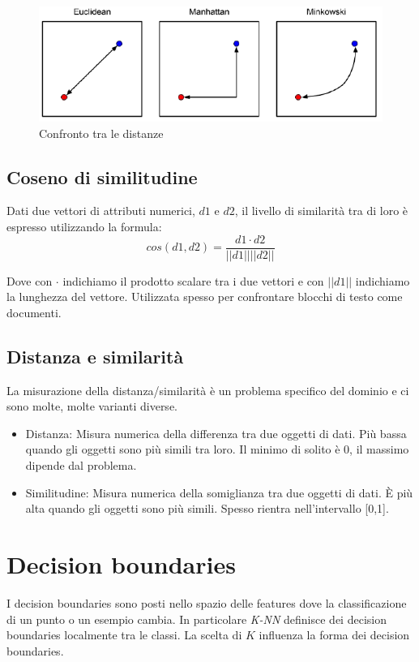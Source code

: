 \begin{figure}
	\centering
	\includegraphics[width=0.6\linewidth]{imgs/chapter3/img2}
	\caption{Confronto tra le distanze}
	\label{fig:chapter03-02}
\end{figure}

	\subsection{Coseno di similitudine}
	
	Dati due vettori di attributi numerici, $d1$ e $d2$, il livello di similarità tra di loro \`e espresso utilizzando la formula:
	$$cos(d1,d2)=\frac{d1 \cdot d2}{||d1|| ||d2||}$$
	
	Dove con $\cdot$ indichiamo il prodotto scalare tra i due vettori e con $||d1||$ indichiamo la lunghezza del vettore. 
	Utilizzata spesso per confrontare blocchi di testo come documenti.

	\subsection{Distanza e similarit\`a}
	La misurazione della distanza/similarità \`e un problema specifico del dominio e ci sono molte, molte varianti diverse.
	\begin{itemize}
		\item Distanza: Misura numerica della differenza tra due oggetti di dati. Più bassa quando gli oggetti sono più simili tra loro. Il minimo di solito \`e 0, il massimo dipende dal problema.
		\item Similitudine: Misura numerica della somiglianza tra due oggetti di dati. È più alta quando gli oggetti sono più simili. Spesso rientra nell'intervallo [0,1].
	\end{itemize}
\section{Decision boundaries}
I decision boundaries sono posti nello spazio delle features dove la classificazione di un punto o un esempio cambia.
In particolare \emph{K-NN} definisce dei decision boundaries localmente tra le classi. 
La scelta di $K$ influenza la forma dei decision boundaries.

